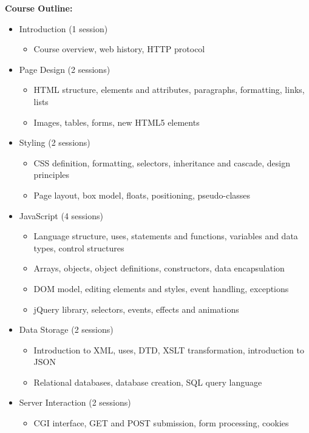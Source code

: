 \documentclass[12pt]{article}
\begin{document}
\textbf{Course Outline:}
\begin{itemize}
    \item Introduction (1 session)
    \begin{itemize}
        \item Course overview, web history, HTTP protocol
    \end{itemize}
    \item Page Design (2 sessions)
    \begin{itemize}
        \item HTML structure, elements and attributes, paragraphs, formatting, links, lists
        \item Images, tables, forms, new HTML5 elements
    \end{itemize}
    \item Styling (2 sessions)
    \begin{itemize}
        \item CSS definition, formatting, selectors, inheritance and cascade, design principles
        \item Page layout, box model, floats, positioning, pseudo-classes
    \end{itemize}
    \item JavaScript (4 sessions)
    \begin{itemize}
        \item Language structure, uses, statements and functions, variables and data types, control structures
        \item Arrays, objects, object definitions, constructors, data encapsulation
        \item DOM model, editing elements and styles, event handling, exceptions
        \item jQuery library, selectors, events, effects and animations
    \end{itemize}
    \item Data Storage (2 sessions)
    \begin{itemize}
        \item Introduction to XML, uses, DTD, XSLT transformation, introduction to JSON
        \item Relational databases, database creation, SQL query language
    \end{itemize}
    \item Server Interaction (2 sessions)
    \begin{itemize}
        \item CGI interface, GET and POST submission, form processing, cookies

\end{itemize}
\end{itemize}
\end{document}
